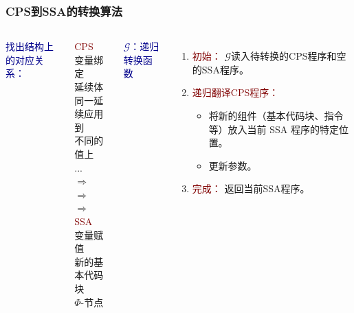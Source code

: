 \begin{frame}
    \frametitle{CPS到SSA的转换算法}
    \begin{columns}[t, onlytextwidth]
        \large
        \textcolor{DarkBlue}{找出结构上的对应关系：}\\
        \normalsize
        \vspace{2ex}
        \begin{columns}[t, onlytextwidth]
            \textcolor{Maroon}{CPS} \\
            \vspace{1ex}
            变量绑定 \\
            延续体 \\
            同一延续应用到\\ 不同的值上 \\
            ...
            \\
            \vspace{1ex}
            $\Rightarrow $ \\
            $\Rightarrow $ \\
            \vspace{1.5ex}
            $\Rightarrow $ \\
            \textcolor{Maroon}{SSA}\\
            \vspace{1ex}
            变量赋值\\
            新的基本代码块 \\
            \vspace{1.5ex}
            $\Phi$-节点 \\
        \end{columns}

    \large
    \textcolor{DarkBlue}{$\mathcal{G}$：递归转换函数}
    \normalsize
    \vspace{1ex}
    \begin{enumerate}
        \item \textcolor{Maroon}{初始：} $\mathcal{G}$读入待转换的CPS程序和空的SSA程序。
        \item \textcolor{Maroon}{递归翻译CPS程序：}
        \begin{itemize}
            \item 将新的组件（基本代码块、指令等）放入当前 SSA 程序的特定位置。
            \item 更新参数。
        \end{itemize}
        \item \textcolor{Maroon}{完成：} 返回当前SSA程序。  
    \end{enumerate}
\end{columns}
\end{frame}

